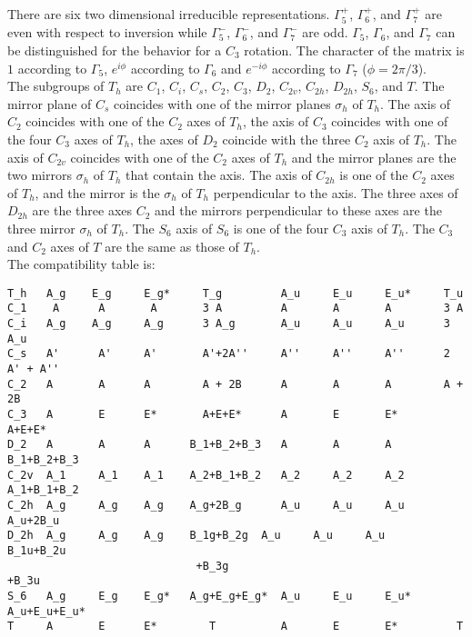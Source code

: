 \documentclass[12pt,a4paper,twoside]{report}
\begin{document}
There are six two dimensional irreducible representations. $\Gamma_5^+$,
$\Gamma_6^+$, and $\Gamma_7^+$ are even with respect to inversion while
$\Gamma_5^-$, $\Gamma_6^-$, and $\Gamma_7^-$ are odd. $\Gamma_5$,
$\Gamma_6$, and $\Gamma_7$ can be distinguished for the behavior for a $C_3$ 
rotation. The character of the matrix is $1$ according to 
$\Gamma_5$, $e^{i\phi}$ according to $\Gamma_6$ and $e^{-i\phi}$ according 
to $\Gamma_7$ ($\phi=2\pi/3$). \\
The subgroups of $T_h$ are $C_1$, $C_i$, $C_s$, $C_2$, $C_3$, $D_2$, $C_{2v}$,
$C_{2h}$, $D_{2h}$, $S_6$, and $T$. The mirror plane of $C_s$ coincides
with one of the mirror planes $\sigma_h$ of $T_h$. The axis of $C_2$ coincides 
with one of the $C_2$ axes of $T_h$, the axis of $C_3$ coincides with one of the four
$C_3$ axes of $T_h$, the axes of $D_2$ coincide with the three $C_2$ axis
of $T_h$. The axis of $C_{2v}$ coincides with one of the $C_2$ axes of 
$T_h$ and the mirror planes are the two mirrors $\sigma_h$ of $T_h$ that
contain the axis. The axis of $C_{2h}$ is one of the $C_2$ axes of $T_h$,
and the mirror is the $\sigma_h$ of $T_h$ perpendicular to the
axis. The three axes of $D_{2h}$ are the three axes $C_2$ and the mirrors
perpendicular to these axes are the three mirror $\sigma_h$ of $T_h$.
The $S_6$ axis of $S_6$ is one of the four $C_3$ axis of $T_h$.
The $C_3$ and $C_2$ axes of $T$ are the same as those of $T_h$. \\
The compatibility table is:

\begin{tcolorbox}
\begin{scriptsize}
\begin{verbatim}
T_h   A_g    E_g     E_g*     T_g         A_u     E_u     E_u*     T_u
C_1    A      A       A       3 A         A       A       A        3 A
C_i   A_g    A_g     A_g      3 A_g       A_u     A_u     A_u      3 A_u
C_s   A'      A'     A'       A'+2A''     A''     A''     A''      2 A' + A''
C_2   A       A      A        A + 2B      A       A       A        A + 2B
C_3   A       E      E*       A+E+E*      A       E       E*       A+E+E*
D_2   A       A      A      B_1+B_2+B_3   A       A       A        B_1+B_2+B_3
C_2v  A_1     A_1    A_1    A_2+B_1+B_2   A_2     A_2     A_2      A_1+B_1+B_2
C_2h  A_g     A_g    A_g    A_g+2B_g      A_u     A_u     A_u      A_u+2B_u
D_2h  A_g     A_g    A_g    B_1g+B_2g  A_u     A_u     A_u         B_1u+B_2u
                             +B_3g                                   +B_3u
S_6   A_g     E_g    E_g*   A_g+E_g+E_g*  A_u     E_u     E_u*   A_u+E_u+E_u*
T     A       E      E*        T          A       E       E*         T
\end{verbatim}
\end{scriptsize}
\end{tcolorbox}
\end{document}
